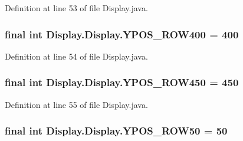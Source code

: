 Definition at line 53 of file Display.\+java.

\hypertarget{class_display_1_1_display_a30efc4ca7cf960942741ac557862fbc8}{}
\subsubsection[{Y\+P\+O\+S\+\_\+\+R\+O\+W400}]{\setlength{\rightskip}{0pt plus 5cm}final int Display.\+Display.\+Y\+P\+O\+S\+\_\+\+R\+O\+W400 = 400\hspace{0.3cm}{\ttfamily [static]}}\label{class_display_1_1_display_a30efc4ca7cf960942741ac557862fbc8}


Definition at line 54 of file Display.\+java.

\hypertarget{class_display_1_1_display_a68978a2870b55dbd8b5ab6d93db2ed79}{}
\subsubsection[{Y\+P\+O\+S\+\_\+\+R\+O\+W450}]{\setlength{\rightskip}{0pt plus 5cm}final int Display.\+Display.\+Y\+P\+O\+S\+\_\+\+R\+O\+W450 = 450\hspace{0.3cm}{\ttfamily [static]}}\label{class_display_1_1_display_a68978a2870b55dbd8b5ab6d93db2ed79}


Definition at line 55 of file Display.\+java.

\hypertarget{class_display_1_1_display_abfcff615e1843cea5f5f5236f7270469}{}
\subsubsection[{Y\+P\+O\+S\+\_\+\+R\+O\+W50}]{\setlength{\rightskip}{0pt plus 5cm}final int Display.\+Display.\+Y\+P\+O\+S\+\_\+\+R\+O\+W50 = 50\hspace{0.3cm}{\ttfamily [static]}}\label{class_display_1_1_display_abfcff615e1843cea5f5f5236f7270469}


